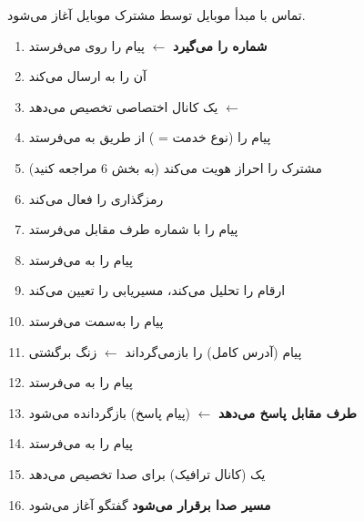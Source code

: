 

\CNchained{}

تماس با مبدأ موبایل توسط مشترک موبایل آغاز می‌شود.


\begin{enumerate}
\def\labelenumi{\arabic{enumi}.}
\tightlist
\item
  \textbf{ شماره را می‌گیرد} \ensuremath{\leftarrow} پیام  را روی  می‌فرستد
\item
   آن را به  ارسال می‌کند
\item
   یک کانال اختصاصی  تخصیص می‌دهد \ensuremath{\leftarrow} 
\item
   پیام  را (نوع خدمت = ) از طریق  به  می‌فرستد
\item
   مشترک را احراز هویت می‌کند (به بخش 6 مراجعه کنید)
\item
   رمزگذاری را فعال می‌کند
\item
   پیام  را با شماره طرف مقابل می‌فرستد
\item
   پیام  را به  می‌فرستد
\item
   ارقام را تحلیل می‌کند، مسیریابی را تعیین می‌کند
\item
   پیام  را به‌سمت  می‌فرستد
\item
   پیام  (آدرس کامل) را بازمی‌گرداند \ensuremath{\leftarrow} زنگ برگشتی
\item
   پیام  را به  می‌فرستد
\item
  \textbf{طرف مقابل پاسخ می‌دهد} \ensuremath{\leftarrow}  (پیام پاسخ) بازگردانده می‌شود
\item
   پیام  را به  می‌فرستد
\item
   یک  (کانال ترافیک) برای صدا تخصیص می‌دهد
\item
  \textbf{مسیر صدا برقرار می‌شود}  گفتگو آغاز می‌شود
\end{enumerate}

